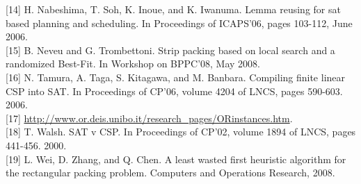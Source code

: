 \documentclass[10pt]{article}
\begin{document}
[14] H. Nabeshima, T. Soh, K. Inoue, and K. Iwanuma. Lemma reusing for sat based planning and scheduling. In Proceedings of ICAPS'06, pages 103-112, June 2006.\\[0pt]
[15] B. Neveu and G. Trombettoni. Strip packing based on local search and a randomized Best-Fit. In Workshop on BPPC'08, May 2008.\\[0pt]
[16] N. Tamura, A. Taga, S. Kitagawa, and M. Banbara. Compiling finite linear CSP into SAT. In Proceedings of CP'06, volume 4204 of LNCS, pages 590-603. 2006.\\[0pt]
[17] \href{http://www.or.deis.unibo.it/research_pages/ORinstances.htm}{http://www.or.deis.unibo.it/research\_pages/ORinstances.htm}.\\[0pt]
[18] T. Walsh. SAT v CSP. In Proceedings of CP'02, volume 1894 of LNCS, pages 441-456. 2000.\\[0pt]
[19] L. Wei, D. Zhang, and Q. Chen. A least wasted first heuristic algorithm for the rectangular packing problem. Computers and Operations Research, 2008.
\end{document}
